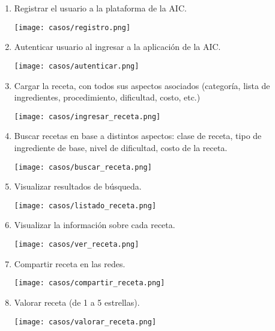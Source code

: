 \documentclass{\ClassPath/viu-tfm-template}
\begin{document}
\vspace{-1em}
\begin{enumerate}[label=\alph*)]
    \item Registrar el usuario a la plataforma de la AIC.

    \begin{center}
        \texttt{[image: casos/registro.png]}
    \end{center}


    \item Autenticar usuario al ingresar a la aplicación de la AIC.

    \begin{center}
        \texttt{[image: casos/autenticar.png]}
    \end{center}

    \item Cargar la receta, con todos sus aspectos asociados (categoría, lista de
    ingredientes, procedimiento, dificultad, costo, etc.)

    \begin{center}
        \texttt{[image: casos/ingresar\_receta.png]}
    \end{center}


    \item Buscar recetas en base a distintos aspectos: clase de receta, tipo de ingrediente de base, nivel de dificultad, costo de la receta.

    \begin{center}
        \texttt{[image: casos/buscar\_receta.png]}
    \end{center}


    \item Visualizar resultados de búsqueda.

    \begin{center}
        \texttt{[image: casos/listado\_receta.png]}
    \end{center}

    \item Visualizar la información sobre cada receta.

    \begin{center}
        \texttt{[image: casos/ver\_receta.png]}
    \end{center}

    \item Compartir receta en las redes.

    \begin{center}
        \texttt{[image: casos/compartir\_receta.png]}
    \end{center}

    \item Valorar receta (de 1 a 5 estrellas).

    \begin{center}
        \texttt{[image: casos/valorar\_receta.png]}
    \end{center}
\end{enumerate}
\end{document}
